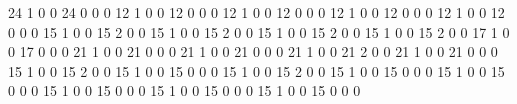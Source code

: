 24
1
0
0
24
0
0
0
12
1
0
0
12
0
0
0
12
1
0
0
12
0
0
0
12
1
0
0
12
0
0
0
12
1
0
0
12
0
0
0
15
1
0
0
15
2
0
0
15
1
0
0
15
2
0
0
15
1
0
0
15
2
0
0
15
1
0
0
15
2
0
0
17
1
0
0
17
0
0
0
21
1
0
0
21
0
0
0
21
1
0
0
21
0
0
0
21
1
0
0
21
2
0
0
21
1
0
0
21
0
0
0
15
1
0
0
15
2
0
0
15
1
0
0
15
0
0
0
15
1
0
0
15
2
0
0
15
1
0
0
15
0
0
0
15
1
0
0
15
0
0
0
15
1
0
0
15
0
0
0
15
1
0
0
15
0
0
0
15
1
0
0
15
0
0
0
